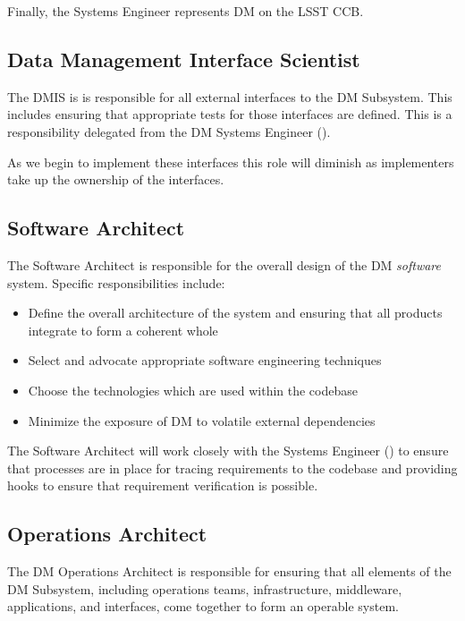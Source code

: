 Finally, the \gls{Systems Engineer} represents \gls{DM} on the \gls{LSST} \gls{CCB}.

\subsection{Data Management Interface Scientist}\label{role:dmis}

The \gls{DMIS} is is responsible for all external interfaces to the \gls{DM} \gls{Subsystem}. This includes ensuring that appropriate tests for those interfaces are defined. This is a responsibility delegated from the \gls{DM} \gls{Systems Engineer} ().

As we begin to implement these interfaces this role will diminish as implementers take up the ownership of the interfaces.

\subsection{Software Architect \label{role:softarc}}

The Software Architect is responsible for the overall design of the \gls{DM} \textit{software} system. Specific responsibilities include:

\begin{itemize}

\item{Define the overall architecture of the system and ensuring that all products integrate to form a coherent whole}
\item{Select and advocate appropriate software engineering techniques}
\item{Choose the technologies which are used within the codebase}
\item{Minimize the exposure of \gls{DM} to volatile external dependencies}

\end{itemize}

The Software Architect will work closely with the \gls{Systems Engineer} () to ensure that processes are in place for tracing requirements to the codebase and providing hooks to ensure that requirement verification is possible.

\subsection{Operations Architect \label{role:opsarc}}

The \gls{DM} \gls{Operations} Architect is responsible for ensuring that all elements of the \gls{DM} \gls{Subsystem}, including operations teams, infrastructure, middleware, applications, and interfaces,
come together to form an operable system.

